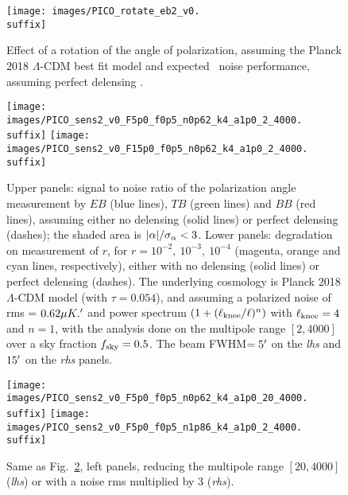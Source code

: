 \documentclass[PICOReport.tex]{subfiles}
\begin{document}
\begin{figure}[htb]
\texttt{[image: images/PICO\_rotate\_eb2\_v0.\\suffix]}
\caption{\label{fig:rot_bb_tb_eb} Effect of a rotation of the angle of polarization, assuming the Planck 2018 $\Lambda$-CDM best fit model \citep{Planck2018_VI} and expected \pico\ noise performance, assuming perfect delensing .}
\end{figure}
%
\begin{figure}[htb]
\texttt{[image: images/PICO\_sens2\_v0\_F5p0\_f0p5\_n0p62\_k4\_a1p0\_2\_4000.\\suffix]}
\texttt{[image: images/PICO\_sens2\_v0\_F15p0\_f0p5\_n0p62\_k4\_a1p0\_2\_4000.\\suffix]}
\caption{\label{fig:rot_sens_0} Upper panels: signal to noise ratio of the polarization angle {\prang} measurement
by $EB$ (blue lines), $TB$ (green lines) and $BB$ (red lines), assuming either no delensing (solid lines) 
or perfect delensing (dashes); the shaded area is $|\alpha|/\sigma_{\alpha} < 3$.
Lower panels: degradation on measurement of $r$, for $r=10^{-2},\ 10^{-3},\ 10^{-4}$ (magenta, orange and cyan lines, respectively),
either with no delensing (solid lines) or perfect delensing (dashes).
The underlying cosmology is Planck 2018 $\Lambda$-CDM model (with $\tau = 0.054$), and assuming a polarized noise of rms = $0.62 \mu K.'$ and power spectrum $(1 + (\ell_{\rm knee}/\ell)^n)$ with $\ell_{\rm knee}=4$ and $n=1$, with the analysis done on the multipole range $[2,4000]$ over a sky fraction $f_{\rm sky}=0.5$. The beam FWHM$=5'$ on the \emph{lhs} and $15'$
on the \emph{rhs} panels.}
\end{figure}
%
%
\begin{figure}[htb]
\texttt{[image: images/PICO\_sens2\_v0\_F5p0\_f0p5\_n0p62\_k4\_a1p0\_20\_4000.\\suffix]}
\texttt{[image: images/PICO\_sens2\_v0\_F5p0\_f0p5\_n1p86\_k4\_a1p0\_2\_4000.\\suffix]}
\caption{\label{fig:rot_sens_2} Same as Fig.~\ref{fig:rot_sens_0}, left panels, reducing the multipole range $[20,4000]$ (\emph{lhs}) or with a noise rms multiplied by 3 (\emph{rhs}).}
\end{figure}
\end{document}
